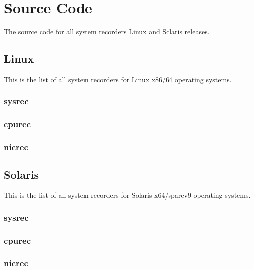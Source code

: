 
\chapter{Source Code}
The source code for all system recorders Linux and Solaris 
releases.


\section{Linux}
\noindent
This is the list of all system recorders for Linux x86/64 operating systems.  
\subsection*{sysrec}


\subsection*{cpurec}


\subsection*{nicrec}


\section{Solaris}
\noindent
This is the list of all system recorders for Solaris x64/sparcv9 operating 
systems.  

\subsection*{sysrec}


\subsection*{cpurec}


\subsection*{nicrec}


\endinput

